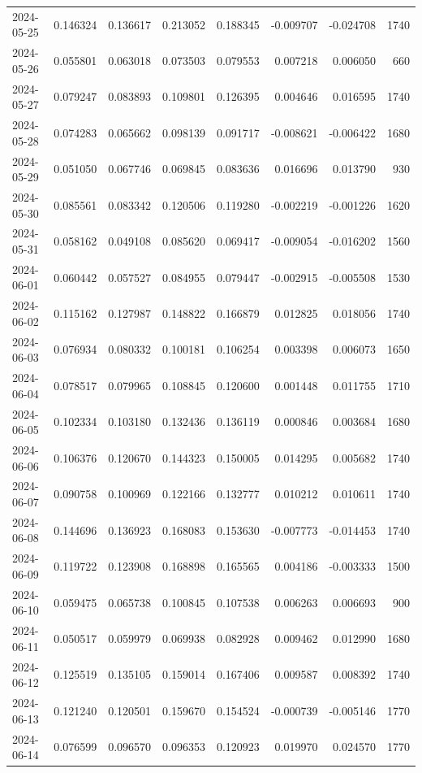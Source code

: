 \begin{tabular}{lrrrrrrr}
2024-05-25 & 0.146324 & 0.136617 & 0.213052 & 0.188345 & -0.009707 & -0.024708 & 1740 \\
2024-05-26 & 0.055801 & 0.063018 & 0.073503 & 0.079553 & 0.007218 & 0.006050 & 660 \\
2024-05-27 & 0.079247 & 0.083893 & 0.109801 & 0.126395 & 0.004646 & 0.016595 & 1740 \\
2024-05-28 & 0.074283 & 0.065662 & 0.098139 & 0.091717 & -0.008621 & -0.006422 & 1680 \\
2024-05-29 & 0.051050 & 0.067746 & 0.069845 & 0.083636 & 0.016696 & 0.013790 & 930 \\
2024-05-30 & 0.085561 & 0.083342 & 0.120506 & 0.119280 & -0.002219 & -0.001226 & 1620 \\
2024-05-31 & 0.058162 & 0.049108 & 0.085620 & 0.069417 & -0.009054 & -0.016202 & 1560 \\
2024-06-01 & 0.060442 & 0.057527 & 0.084955 & 0.079447 & -0.002915 & -0.005508 & 1530 \\
2024-06-02 & 0.115162 & 0.127987 & 0.148822 & 0.166879 & 0.012825 & 0.018056 & 1740 \\
2024-06-03 & 0.076934 & 0.080332 & 0.100181 & 0.106254 & 0.003398 & 0.006073 & 1650 \\
2024-06-04 & 0.078517 & 0.079965 & 0.108845 & 0.120600 & 0.001448 & 0.011755 & 1710 \\
2024-06-05 & 0.102334 & 0.103180 & 0.132436 & 0.136119 & 0.000846 & 0.003684 & 1680 \\
2024-06-06 & 0.106376 & 0.120670 & 0.144323 & 0.150005 & 0.014295 & 0.005682 & 1740 \\
2024-06-07 & 0.090758 & 0.100969 & 0.122166 & 0.132777 & 0.010212 & 0.010611 & 1740 \\
2024-06-08 & 0.144696 & 0.136923 & 0.168083 & 0.153630 & -0.007773 & -0.014453 & 1740 \\
2024-06-09 & 0.119722 & 0.123908 & 0.168898 & 0.165565 & 0.004186 & -0.003333 & 1500 \\
2024-06-10 & 0.059475 & 0.065738 & 0.100845 & 0.107538 & 0.006263 & 0.006693 & 900 \\
2024-06-11 & 0.050517 & 0.059979 & 0.069938 & 0.082928 & 0.009462 & 0.012990 & 1680 \\
2024-06-12 & 0.125519 & 0.135105 & 0.159014 & 0.167406 & 0.009587 & 0.008392 & 1740 \\
2024-06-13 & 0.121240 & 0.120501 & 0.159670 & 0.154524 & -0.000739 & -0.005146 & 1770 \\
2024-06-14 & 0.076599 & 0.096570 & 0.096353 & 0.120923 & 0.019970 & 0.024570 & 1770 \\

\end{tabular}
